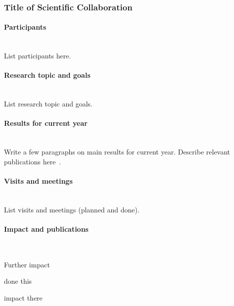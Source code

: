 
\subsubsection{Title of Scientific Collaboration}
\label{sec.report.xx} %

\begin{refsection}[mybeautifulproject]

\paragraph{Participants}~\\

List participants here.


\paragraph{Research topic and goals}~\\

List research topic and goals.


\paragraph{Results for current year}~\\

Write a few paragraphs on main results for current year. Describe relevant publications here~\cite{j132,j133}.

\paragraph{Visits and meetings}~\\

List visits and meetings (planned and done).


\paragraph{Impact and publications}~\\

\printbibliography[heading=none,keyword=own]

Further impact
\begin{itemize*}
    \item done this
    \item impact there
\end{itemize*}


\end{refsection}
